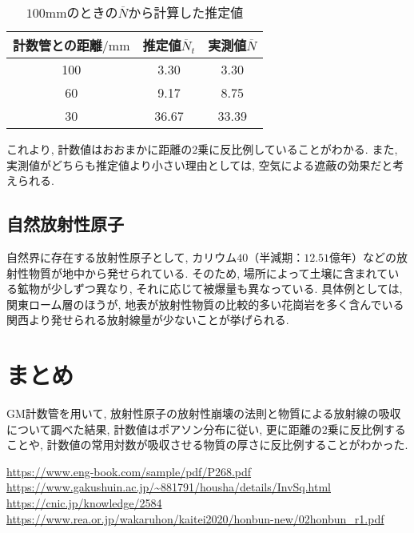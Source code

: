 \documentclass{jarticle}
\begin{document}
\begin{table}[H]
  \centering
  \caption{$100\mathrm{mm}$のときの$\overline{N}$から計算した推定値}
  \label{tb:N-and-distance-estimation}
  \begin{tabular}{ccc}
    \hline
    計数管との距離$/\mathrm{mm}$ & 推定値$\overline{N}_t$ & 実測値$\overline{N}$ \\
    \hline
    100 & 3.30 & 3.30 \\
    60 & 9.17 & 8.75 \\
    30 & 36.67 & 33.39 \\
    \hline
  \end{tabular}
\end{table}

これより, 計数値はおおまかに距離の$2$乗に反比例していることがわかる.
また, 実測値がどちらも推定値より小さい理由としては, 空気による遮蔽の効果だと考えられる\cite{2乗に反比例}.


\subsection{自然放射性原子}

自然界に存在する放射性原子として, カリウム$40$（半減期：$12.51$億年\cite{K40半減期}）などの放射性物質が地中から発せられている.
そのため, 場所によって土壌に含まれている鉱物が少しずつ異なり, それに応じて被爆量も異なっている.
具体例としては, 関東ローム層のほうが, 地表が放射性物質の比較的多い花崗岩を多く含んでいる関西より発せられる放射線量が少ないことが挙げられる\cite{さまざまな被爆}.



\section{まとめ}

GM計数管を用いて, 放射性原子の放射性崩壊の法則と物質による放射線の吸収について調べた結果, 計数値はポアソン分布に従い, 更に距離の$2$乗に反比例することや, 計数値の常用対数が吸収させる物質の厚さに反比例することがわかった.


\begin{thebibliography}{99}

   \url{https://www.eng-book.com/sample/pdf/P268.pdf}
   \url{https://www.gakushuin.ac.jp/~881791/housha/details/InvSq.html}
   \url{https://cnic.jp/knowledge/2584}
   \url{https://www.rea.or.jp/wakaruhon/kaitei2020/honbun-new/02honbun_r1.pdf}

\end{thebibliography}
\end{document}
